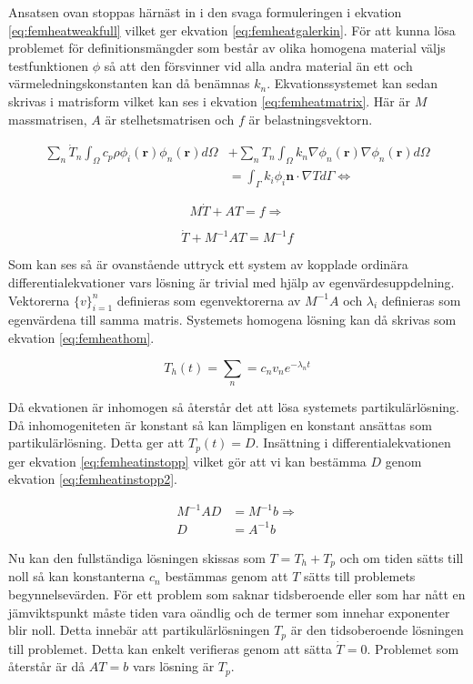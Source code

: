 \noindent
Ansatsen ovan stoppas härnäst in i den svaga formuleringen i ekvation
\eqref{eq:femheatweakfull} vilket ger ekvation \eqref{eq:femheatgalerkin}.
För att kunna lösa problemet för definitionsmängder som består av olika
homogena material väljs testfunktionen $\phi$ så att den försvinner vid
alla andra material än ett och värmeledningskonstanten kan då benämnas $k_n$.
Ekvationssystemet kan sedan skrivas i matrisform vilket kan ses i ekvation
\eqref{eq:femheatmatrix}. Här är $M$ massmatrisen, $A$ är stelhetsmatrisen och
$f$ är belastningsvektorn.

\begin{align}
\label{eq:femheatgalerkin}
\sum_n \dot{T}_n \int_\Omega c_p\rho\phi_i(\mathbf{r})
\phi_n(\mathbf{r})d\Omega
& + \sum_n T_n \int_\Omega k_n \nabla\phi_n(\mathbf{r})\nabla\phi_n(\mathbf{r})
d\Omega \\
&= \int_\Gamma k_i\phi_i\mathbf{n}\cdot\nabla Td\Gamma \Leftrightarrow
\nonumber
\end{align}

\begin{equation}
\label{eq:femheatmatrix}
M\dot{T} + AT = f \Rightarrow
\end{equation}

\begin{equation}
\label{eq:femheatmatrix2}
\dot{T} + M^{-1}AT = M^{-1}f
\end{equation}

\noindent
Som kan ses så är ovanstående uttryck ett system av kopplade ordinära
differentialekvationer vars lösning är trivial med hjälp av egenvärdesuppdelning.
Vektorerna $\{v\}^n_{i=1}$ definieras som egenvektorerna av
$M^{-1}A$ och $\lambda_i$ definieras som egenvärdena till samma matris.
Systemets homogena lösning kan då skrivas som ekvation
\eqref{eq:femheathom}.\cite{lay06}

\begin{equation}
\label{eq:femheathom}
T_h(t) = \sum_n = c_nv_ne^{-\lambda_nt}
\end{equation}

\noindent
Då ekvationen är inhomogen så återstår det att lösa systemets
partikulärlösning. Då inhomogeniteten är konstant så kan lämpligen
en konstant ansättas som partikulärlösning. Detta ger att
$T_p(t) = D$. Insättning i differentialekvationen ger
ekvation \eqref{eq:femheatinstopp} vilket gör att vi kan bestämma
$D$ genom ekvation \eqref{eq:femheatinstopp2}.

\begin{align}
\label{eq:femheatinstopp}
M^{-1}AD &= M^{-1}b \Rightarrow\\
\label{eq:femheatinstopp2}
D &= A^{-1}b
\end{align}

\noindent
Nu kan den fullständiga lösningen skissas som $T = T_h + T_p$ och om
tiden sätts till noll så kan konstanterna $c_n$ bestämmas genom
att $T$ sätts till problemets begynnelsevärden. För ett problem som
saknar tidsberoende eller som har nått en jämviktspunkt måste
tiden vara oändlig och de termer som innehar exponenter blir noll.
Detta innebär att partikulärlösningen $T_p$ är den tidsoberoende lösningen
till problemet. Detta kan enkelt verifieras genom att sätta $\dot{T} = 0$.
Problemet som återstår är då $AT = b$ vars lösning är $T_p$.
